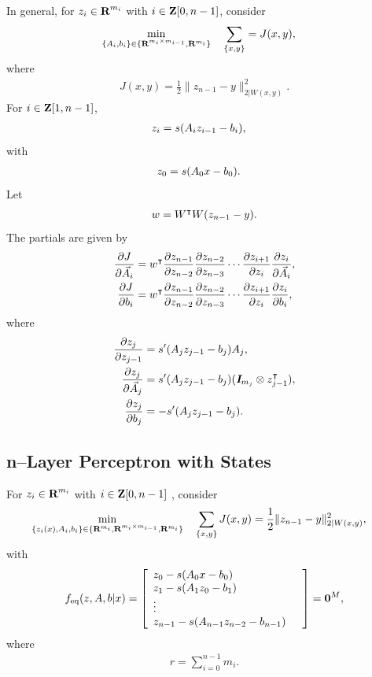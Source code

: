 \documentclass{article}
\begin{document}
    In general, for $z_i\in\textbf{R}^{m_i}$ with $i\in\textbf{Z}[0,n-1]$, consider
    \begin{align*}
        \min_{\{A_i,b_i\}\in\{\textbf{R}^{m_i\times m_{i-1}},\textbf{R}^{m_i}\}}\quad 
        \sum_{\{x,y\}}&=J(x,y),
    \end{align*}
    where
    \begin{align*}
        J(x,y)=\frac{1}{2}\|z_{n-1}-y \|_{2|W(x,y)}^2.
    \end{align*}
    For $i\in\textbf{Z}[1,n-1]$,
    \begin{align*}
        z_i&=s(A_iz_{i-1}-b_i),
    \end{align*}
    with
    \begin{align*}
        z_0&=s(A_0x-b_0).
    \end{align*}
    Let
    \begin{align*}
        w=  W^\intercal W (z_{n-1}-y).
    \end{align*}
    The partials are given by
    \begin{align*}
        \frac{\partial  J }{\partial \vec{A}_i}&=w^\intercal \frac{\partial z_{n-1}}{\partial z_{n-2}}\frac{\partial z_{n-2}}{\partial z_{n-3}}\cdots
        \frac{\partial z_{i+1}}{\partial z_i}\frac{\partial z_i}{\partial \vec{A}_i},\\
        \frac{\partial  J }{\partial b_i}&=w^\intercal \frac{\partial z_{n-1}}{\partial z_{n-2}}\frac{\partial z_{n-2}}{\partial z_{n-3}}\cdots
        \frac{\partial z_{i+1}}{\partial z_i}\frac{\partial z_i}{\partial b_i},
    \end{align*}
    where
    \begin{align*}
        \frac{\partial z_j}{\partial z_{j-1}}&=s'(A_jz_{j-1} -b_j)A_j,\\
        \frac{\partial z_j}{\partial \vec{A}_j}&=s'(A_jz_{j-1} -b_j)(\emph{\textbf{I}}_{m_j}\otimes z_{j-1} ^\intercal),\\
        \frac{\partial z_j}{\partial b_j}&=-s'(A_jz_{j-1} -b_j).
    \end{align*}

\subsection{n--Layer Perceptron with States}

    For $z_i\in\textbf{R}^{m_i}$ with $i\in\textbf{Z}[0,n-1]$ , consider
    \begin{align*}
        \min_{\{z_i(x),A_i,b_i\}\in\{\textbf{R}^{m_i},\textbf{R}^{m_i\times m_{i-1}},\textbf{R}^{m_i}\}}
        \quad \sum_{\{x,y\}}
        J (x,y)&=\frac{1}{2}\|z_{n-1}-y \|_{2|W(x,y)}^2,
    \end{align*}
    with
    \begin{align*}
        f_{\text{eq}}(z,A,b|x)=\left[\begin{array}{lllllllllllllllllll}
        z_0-s(A_0x-b_0)\\
        z_1-s(A_1z_0-b_1)\\
        \vdots&\\
        z_{n-1}-s(A_{n-1}z_{n-2}-b_{n-1})\end{array}\right]=\textbf{0}^M,
    \end{align*}
    where
    \begin{align*}
        r=\sum_{i=0}^{n-1}m_i.
    \end{align*}
\end{document}
